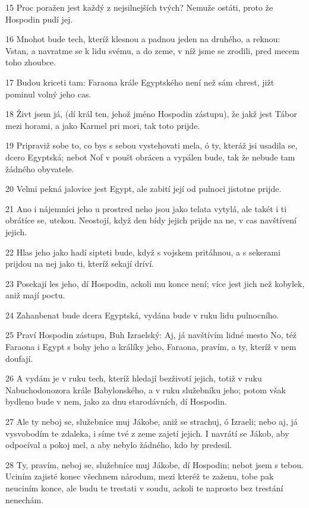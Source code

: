 \par 15 Proc poražen jest každý z nejsilnejších tvých? Nemuže ostáti, proto že Hospodin pudí jej.
\par 16 Mnohot bude tech, kteríž klesnou a padnou jeden na druhého, a reknou: Vstan, a navratme se k lidu svému, a do zeme, v níž jsme se zrodili, pred mecem toho zhoubce.
\par 17 Budou kriceti tam: Faraona krále Egyptského není než sám chrest, jižt pominul volný jeho cas.
\par 18 Živt jsem já, (dí král ten, jehož jméno Hospodin zástupu), že jakž jest Tábor mezi horami, a jako Karmel pri mori, tak toto prijde.
\par 19 Pripraviž sobe to, co bys s sebou vystehovati mela, ó ty, kteráž jsi usadila se, dcero Egyptská; nebot Nof v poušt obrácen a vypálen bude, tak že nebude tam žádného obyvatele.
\par 20 Velmi pekná jalovice jest Egypt, ale zabití její od pulnoci jistotne prijde.
\par 21 Ano i nájemníci jeho u prostred neho jsou jako telata vytylá, ale takét i ti obrátíce se, utekou. Neostojí, když den bídy jejich prijde na ne, v cas navštívení jejich.
\par 22 Hlas jeho jako hadí sipteti bude, když s vojskem pritáhnou, a s sekerami prijdou na nej jako ti, kteríž sekají dríví.
\par 23 Posekají les jeho, dí Hospodin, ackoli mu konce není; více jest jich než kobylek, aniž mají poctu.
\par 24 Zahanbenat bude dcera Egyptská, vydána bude v ruku lidu pulnocního.
\par 25 Praví Hospodin zástupu, Buh Izraelský: Aj, já navštívím lidné mesto No, též Faraona i Egypt s bohy jeho a králíky jeho, Faraona, pravím, a ty, kteríž v nem doufají.
\par 26 A vydám je v ruku tech, kteríž hledají bezživotí jejich, totiž v ruku Nabuchodonozora krále Babylonského, a v ruku služebníku jeho; potom však bydleno bude v nem, jako za dnu starodávních, dí Hospodin.
\par 27 Ale ty neboj se, služebníce muj Jákobe, aniž se strachuj, ó Izraeli; nebo aj, já vysvobodím te zdaleka, i síme tvé z zeme zajetí jejich. I navrátí se Jákob, aby odpocíval a pokoj mel, a aby nebylo žádného, kdo by predesil.
\par 28 Ty, pravím, neboj se, služebníce muj Jákobe, dí Hospodin; nebot jsem s tebou. Uciním zajisté konec všechnem národum, mezi kteréž te zaženu, tobe pak neuciním konce, ale budu te trestati v soudu, ackoli te naprosto bez trestání nenechám.

